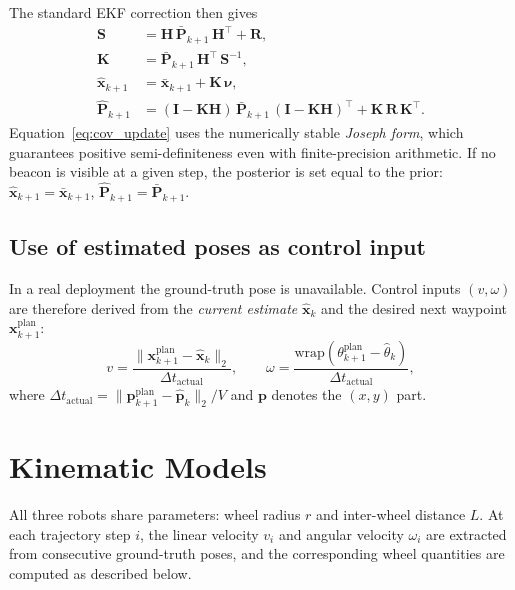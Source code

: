 \documentclass[a4paper,11pt]{report}
\begin{document}
The standard EKF correction then gives
\begin{align}
  \mathbf{S} &= \mathbf{H}\,\bar{\mathbf{P}}_{k+1}\,\mathbf{H}^\top + \mathbf{R}, \label{eq:innov_cov} \\
  \mathbf{K} &= \bar{\mathbf{P}}_{k+1}\,\mathbf{H}^\top\,\mathbf{S}^{-1}, \label{eq:kalman_gain} \\
  \hat{\bm{x}}_{k+1} &= \bar{\bm{x}}_{k+1} + \mathbf{K}\,\bm{\nu}, \label{eq:state_update} \\
  \hat{\mathbf{P}}_{k+1} &= (\mathbf{I} - \mathbf{K}\mathbf{H})\,\bar{\mathbf{P}}_{k+1}\,(\mathbf{I} - \mathbf{K}\mathbf{H})^\top
                            + \mathbf{K}\,\mathbf{R}\,\mathbf{K}^\top. \label{eq:cov_update}
\end{align}
Equation~\eqref{eq:cov_update} uses the numerically stable \emph{Joseph form}, which guarantees positive semi-definiteness even with finite-precision arithmetic.  If no beacon is visible at a given step, the posterior is set equal to the prior: $\hat{\bm{x}}_{k+1} = \bar{\bm{x}}_{k+1}$, $\hat{\mathbf{P}}_{k+1} = \bar{\mathbf{P}}_{k+1}$.

\subsection{Use of estimated poses as control input}

In a real deployment the ground-truth pose is unavailable.  Control inputs $(v, \omega)$ are therefore derived from the \emph{current estimate} $\hat{\bm{x}}_k$ and the desired next waypoint $\bm{x}_{k+1}^{\mathrm{plan}}$:
\begin{equation}
  v = \frac{\|\bm{x}_{k+1}^{\mathrm{plan}} - \hat{\bm{x}}_k\|_2}{\Delta t_{\mathrm{actual}}}, \qquad
  \omega = \frac{\mathrm{wrap}(\theta_{k+1}^{\mathrm{plan}} - \hat\theta_k)}{\Delta t_{\mathrm{actual}}},
\end{equation}
where $\Delta t_{\mathrm{actual}} = \|\bm{p}_{k+1}^{\mathrm{plan}} - \hat{\bm{p}}_k\|_2 / V$ and $\bm{p}$ denotes the $(x,y)$ part.

\section{Kinematic Models}

All three robots share parameters: wheel radius $r$ and inter-wheel distance $L$.  At each trajectory step $i$, the linear velocity $v_i$ and angular velocity $\omega_i$ are extracted from consecutive ground-truth poses, and the corresponding wheel quantities are computed as described below.
\end{document}
